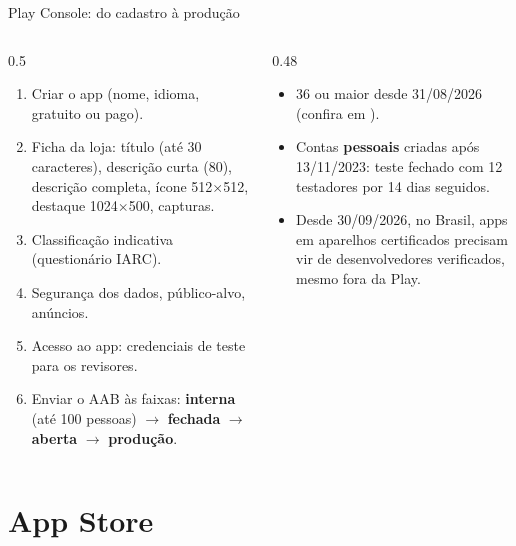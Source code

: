 \documentclass[aspectratio=169,10pt]{beamer}
\begin{document}
\begin{frame}{Play Console: do cadastro à produção}
  \begin{columns}[T]
    \begin{column}{0.5\textwidth}
      \begin{conceito}
        \begin{enumerate}
          \item Criar o app (nome, idioma, gratuito ou pago).
          \item Ficha da loja: título (até 30 caracteres), descrição curta (80), descrição completa, ícone 512$\times$512, destaque 1024$\times$500, capturas.
          \item Classificação indicativa (questionário IARC).
          \item Segurança dos dados, público-alvo, anúncios.
          \item Acesso ao app: credenciais de teste para os revisores.
          \item Enviar o AAB às faixas: \textbf{interna} (até 100 pessoas) $\rightarrow$ \textbf{fechada} $\rightarrow$ \textbf{aberta} $\rightarrow$ \textbf{produção}.
        \end{enumerate}
      \end{conceito}
    \end{column}
    \begin{column}{0.48\textwidth}
      \begin{atencao}
        \begin{itemize}
          \item {} 36 ou maior desde 31/08/2026 (confira em ).
          \item Contas \textbf{pessoais} criadas após 13/11/2023: teste fechado com 12 testadores por 14 dias seguidos.
          \item Desde 30/09/2026, no Brasil, apps em aparelhos certificados precisam vir de desenvolvedores verificados, mesmo fora da Play.
        \end{itemize}
      \end{atencao}
    \end{column}
  \end{columns}
\end{frame}

\section{App Store}
\end{document}
